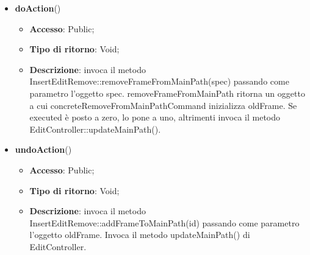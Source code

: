{{{\begin{itemize}
				\begin{itemize}
					\item \textbf{Accesso}: Public;
					\item \textbf{Tipo di ritorno}: Void;
					\item \textbf{Descrizione}: costruisce l’oggetto concreteRemoveFromMainPathCommand.
				\end{itemize}
				\item \textbf{doAction}()
				\begin{itemize}
					\item \textbf{Accesso}: Public;
					\item \textbf{Tipo di ritorno}: Void;
					\item \textbf{Descrizione}: invoca il metodo InsertEditRemove::removeFrameFromMainPath(spec) passando come parametro l'oggetto spec.  removeFrameFromMainPath ritorna un oggetto a cui concreteRemoveFromMainPathCommand inizializza oldFrame. Se executed è posto a zero, lo pone a uno, altrimenti invoca il metodo EditController::updateMainPath().
				\end{itemize}
				\item \textbf{undoAction}()
				\begin{itemize}
					\item \textbf{Accesso}: Public;
					\item \textbf{Tipo di ritorno}: Void;
					\item \textbf{Descrizione}: invoca il metodo InsertEditRemove::addFrameToMainPath(id) passando come parametro l'oggetto oldFrame. Invoca il metodo updateMainPath() di EditController.
				\end{itemize}
			\end{itemize}
			}
}}
